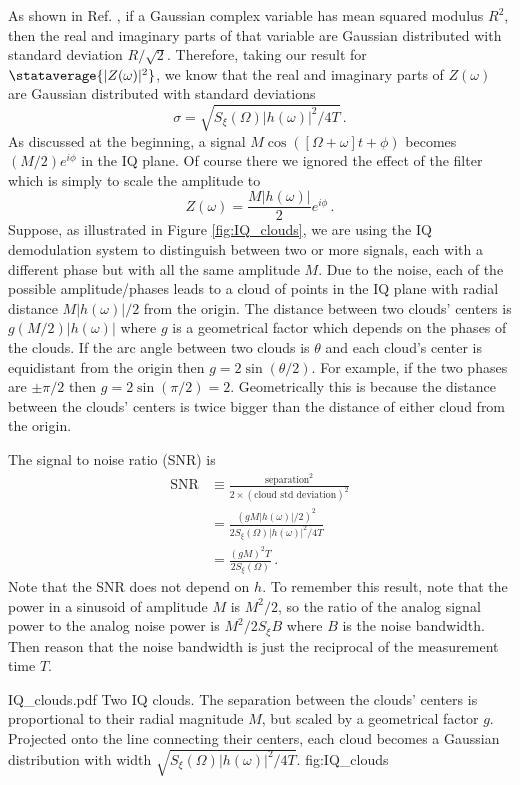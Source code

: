 As shown in Ref. \cite{Sank:whiteNoiseDFT}, if a Gaussian complex variable has mean squared modulus $R^2$, then the real and imaginary parts of that variable are Gaussian distributed with standard deviation $R / \sqrt{2}$.
Therefore, taking our result for $\stataverage{|Z(\omega)|^2}$, we know that the real and imaginary parts of $Z(\omega)$ are Gaussian distributed with standard deviations
\begin{equation}
\sigma = \sqrt{S_\xi(\Omega) |h(\omega)|^2 / 4 T} \, .
\end{equation}
As discussed at the beginning, a signal $M \cos([\Omega + \omega] t + \phi)$ becomes $(M/2)e^{i \phi}$ in the IQ plane.
Of course there we ignored the effect of the filter which is simply to scale the amplitude to
\begin{equation}
Z(\omega) = \frac{M |h(\omega)|}{2} e^{i \phi} \, .
\end{equation}
Suppose, as illustrated in Figure \ref{fig:IQ_clouds}, we are using the IQ demodulation system to distinguish between two or more signals, each with a different phase but with all the same amplitude $M$.
Due to the noise, each of the possible amplitude/phases leads to a cloud of points in the IQ plane with radial distance $M |h(\omega)|/2$ from the origin.
The distance between two clouds' centers is $g(M/2)|h(\omega)|$ where $g$ is a geometrical factor which depends on the phases of the clouds.
If the arc angle between two clouds is $\theta$ and each cloud's center is equidistant from the origin then $g = 2 \sin(\theta / 2)$.
For example, if the two phases are $\pm\pi/2$ then $g=2 \sin(\pi/2) = 2$.
Geometrically this is because the distance between the clouds' centers is twice bigger than the distance of either cloud from the origin.

The signal to noise ratio (SNR) is
\begin{align}
\text{SNR}
& \equiv \frac{\text{separation}^2}{2 \times (\text{cloud std deviation})^2} \\
&= \frac{(g M |h(\omega)|/2)^2}{2 S_\xi(\Omega) |h(\omega)|^2 / 4T} \\
&= \frac{(g M)^2 T}{2 S_\xi(\Omega)}\, .
\end{align}
Note that the SNR does not depend on $h$.
To remember this result, note that the power in a sinusoid of amplitude $M$ is $M^2/2$, so the ratio of the analog signal power to the analog noise power is $M^2 / 2 S_\xi B$ where $B$ is the noise bandwidth.
Then reason that the noise bandwidth is just the reciprocal of the measurement time $T$.

{IQ_clouds.pdf}
{Two IQ clouds. The separation between the clouds' centers is proportional to their radial magnitude $M$, but scaled by a geometrical factor $g$. Projected onto the line connecting their centers, each cloud becomes a Gaussian distribution with width $\sqrt{S_\xi(\Omega)|h(\omega)|^2/4T}$.}
{fig:IQ_clouds}



